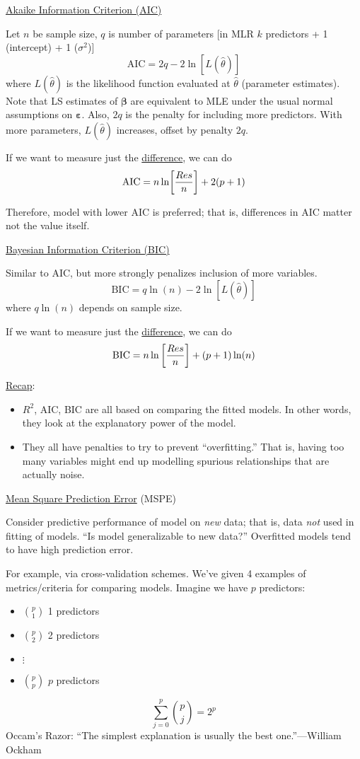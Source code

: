 \underline{Akaike Information Criterion (AIC)}

Let $ n $ be sample size, $ q $ is number of parameters
      [in MLR $ k $ predictors + 1 (intercept) + 1 ($ \sigma^2 $)]
\[ \text{AIC}=2q-2\ln[L(\hat{\theta})] \]
where $ L(\hat{\theta}) $ is the likelihood function evaluated
at $ \hat{\theta} $ (parameter estimates). Note that
LS estimates of $ \symbf{\beta} $ are equivalent to MLE
under the usual normal assumptions on $ \symbf{\varepsilon} $.
Also, $ 2q $ is the penalty for including more predictors.
With more parameters, $ L(\hat{\theta}) $
increases, offset by penalty $ 2q $.

If we want to measure
just the \underline{difference}, we can do
\[ \text{AIC}=n\ln \biggl[\frac{\relax{Res}}{n}\biggr]+2(p+1) \]


Therefore, model with lower AIC is preferred; that is,
differences in AIC matter not the value itself.

\underline{Bayesian Information Criterion (BIC)}

Similar to AIC, but more strongly penalizes
inclusion of more variables.
\[ \text{BIC}=q\ln(n)-2\ln[L(\hat{\theta})] \]
where $ q\ln(n) $ depends on sample size.

If we want to measure
just the \underline{difference}, we can do
\[ \text{BIC}=n\ln\left[ \frac{\relax{Res}}{n} \right]+(p+1)\ln(n) \]

\underline{Recap}:
\begin{itemize}
      \item $ R^2 $, AIC, BIC
            are all based on comparing the fitted models.
            In other words, they look at the explanatory power of
            the model.
      \item They all have penalties to try to prevent
            ``overfitting.'' That is, having too many
            variables might end up modelling
            spurious relationships that are actually
            noise.
\end{itemize}

\underline{Mean Square Prediction Error} (MSPE)

Consider predictive performance of model on \emph{new}
data; that is, data \emph{not} used in fitting
of models. ``Is model generalizable to new data?''
Overfitted models tend to have high prediction error.

For example, via cross-validation schemes.
We've given 4 examples of metrics/criteria for comparing
models. Imagine we have $ p $ predictors:
\begin{itemize}
      \item $ \binom{p}{1} $ 1 predictors
      \item $ \binom{p}{2} $ 2 predictors
      \item $ \vdots $
      \item $ \binom{p}{p} $ $ p $ predictors
\end{itemize}
\[ \sum_{j=0}^{p}\binom{p}{j}=2^p \]
Occam's Razor: ``The simplest explanation is
usually the best one.''---William Ockham
